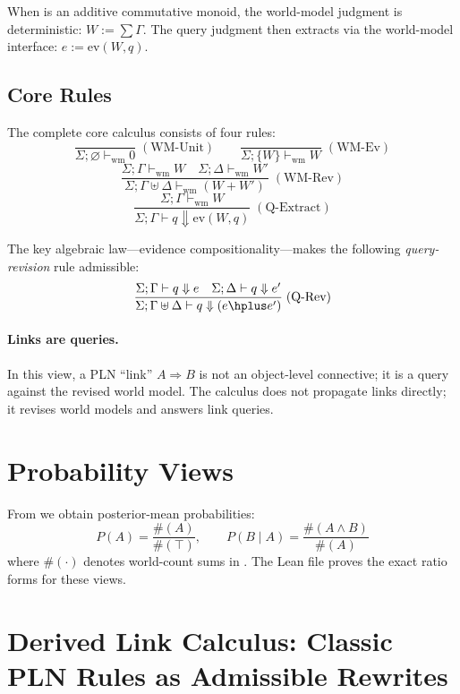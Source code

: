 \documentclass[11pt,openany]{report}
\begin{document}
When  is an additive commutative monoid, the world-model
judgment is deterministic: $W := \sum \Gamma$.  The query judgment then
extracts via the world-model interface: $e := \mathrm{ev}(W, q)$.

\subsection{Core Rules}

The complete core calculus consists of four rules:
\[
\frac{}{\Sigma; \varnothing \vdash_{\mathrm{wm}} 0}
\;(\text{WM-Unit})
\qquad
\frac{}{\Sigma; \{W\} \vdash_{\mathrm{wm}} W}
\;(\text{WM-Ev})
\]
\[
\frac{\Sigma; \Gamma \vdash_{\mathrm{wm}} W \quad
      \Sigma; \Delta \vdash_{\mathrm{wm}} W'}
     {\Sigma; \Gamma \uplus \Delta \vdash_{\mathrm{wm}} (W + W')}
\;(\text{WM-Rev})
\]
\[
\frac{\Sigma; \Gamma \vdash_{\mathrm{wm}} W}
     {\Sigma; \Gamma \vdash q \Downarrow \mathrm{ev}(W, q)}
\;(\text{Q-Extract})
\]

The key algebraic law---evidence compositionality---makes the following
\emph{query-revision} rule admissible:
\[
\frac{\Sigma; \Gamma \vdash q \Downarrow e \quad
      \Sigma; \Delta \vdash q \Downarrow e'}
     {\Sigma; \Gamma \uplus \Delta \vdash q \Downarrow (e \hplus e')}
\;(\text{Q-Rev})
\]

\paragraph{Links are queries.}
In this view, a PLN ``link'' $A \Rightarrow B$ is not an object-level
connective; it is a query  against the revised world model.
The calculus does not propagate links directly; it revises world models and
answers link queries.

\section{Probability Views}

From \Evidence{} we obtain posterior-mean probabilities:
\[
  P(A) = \frac{\#(A)}{\#(\top)}, \qquad
  P(B \mid A) = \frac{\#(A \wedge B)}{\#(A)}
\]
where $\#(\cdot)$ denotes world-count sums in \JointEvidence{}.  The Lean
file  proves
the exact ratio forms for these views.

\section{Derived Link Calculus: Classic PLN Rules as Admissible Rewrites}
\end{document}

